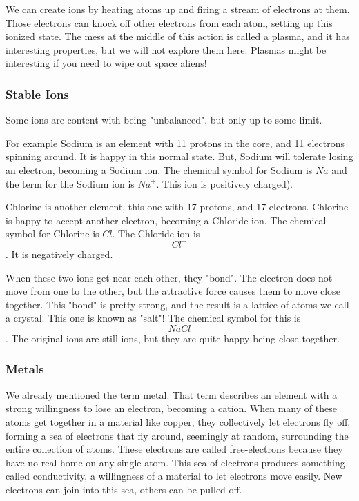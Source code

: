 We can create ions by heating atoms up and firing a stream of electrons
at them. Those electrons can knock off other electrons from each atom, setting
up this ionized state. The mess at the middle of this action is called a
plasma, and it has interesting properties, but we will not explore them
here. Plasmas might be interesting if you need to wipe out space aliens!

\subsubsection{Stable Ions}

Some ions are content with being "unbalanced", but only up to some limit.

For example Sodium is an element with 11 protons in the core, and 11
electrons spinning around. It is happy in this normal state. But, Sodium
will tolerate losing an electron, becoming a Sodium ion. The chemical symbol
for Sodium is $Na$ and the term for the Sodium ion is $Na^{+}$. This
ion is positively charged).

Chlorine is another element, this one with 17 protons, and 17
electrons. Chlorine is happy to accept another electron, becoming a
Chloride ion. The chemical symbol for Chlorine is $Cl$. The Chloride ion is
$$Cl^{-}$$. It is negatively charged.

When these two ions get near each other, they "bond". The electron does not
move from one to the other, but the attractive force causes them to move close
together.  This "bond" is pretty strong, and the result is a lattice of atoms we
call a crystal. This one is known as "salt"! The chemical symbol for this
is $$NaCl$$. The original ions are still ions, but they are quite happy being
close together.

\subsubsection{Metals}

We already mentioned the term metal. That term describes an element with a
strong willingness to lose an electron, becoming a cation. When many of
these atoms get together in a material like copper, they collectively let
electrons fly off, forming a sea of electrons that fly around, seemingly at
random, surrounding the entire collection of atoms. These electrons are called
free-electrons because they have no real home on any single atom. This sea
of electrons produces something called conductivity, a willingness of a
material to let electrons move easily. New electrons can join into this
sea, others can be pulled off.

